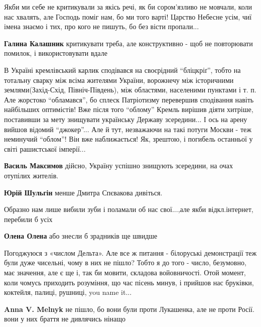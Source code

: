 \begin{itemize}

Якби ми себе не критикували за якісь речі, як би сором'язливо не мовчали, коли
нас хвалять, але Господь поміг нам, бо ми того варті! Царство Небесне усім, чиї
імена знаємо і тих, про кого не пишуть, бо без вісти пропали...

\textbf{Галина Калашник} критикувати треба, але конструктивно - щоб не повторювати помилок, і використовувати вдале


В Україні кремлівський карлик сподівався на своєрідний \enquote{бліцкріґ}, тобто на
тотальну сварку між всіма жителями України, ворожнечу між історичними
землями(Захід-Схід, Північ-Південь), між областями, населеними пунктами і т. п.
Але жорстоко \enquote{обламався}, бо сплеск Патріотизму перевершив сподівання навіть
найбільших оптимістів! Вже після того \enquote{облому} Кремль вирішив діяти хитріше,
поставивши за мету знищувати українську Державу зсередини... І ось на арену
вийшов відомий \enquote{джокер}... Але й тут, незважаючи на такі потуги Москви - теж
неминучий \enquote{облом}! Він вже наближається! Як, зрештою, і погибель останньої у
світі рашистської імперії...

\begin{itemize} %
\textbf{Василь Максимов} дійсно, Україну успішно знищують зсередини, на очах отупілих жителів.

\textbf{Юрій Шульгін} менше Дмитра Спєвакова дивіться.
\end{itemize} %

Образно нам лише вибили зуби і поламали об нас свої...,але якби відкл.інтернет, перебили б усіх

\textbf{Олена Олена} або знесли б зрадників ще швидше


Погоджуюся з «числом Дельта». Але все ж питання - білоруські демонстрації теж
були дуже чисельні, чому в них не пішло? Тобто я до того - число, безумовно,
має значення, але є ще і, так би мовити, складова войовничості. Отой момент,
коли чомусь приходить розуміння, що час пісень минув, і прийшов нас бруківки,
коктейля, палиці, рушниці, you name it...

\begin{itemize} %
\textbf{Anna V. Melnyk} не пішло, бо вони були проти Лукашенка, але не проти Росії. вони у них браття не дивлячись нінащо


\end{itemize}
\end{itemize}
